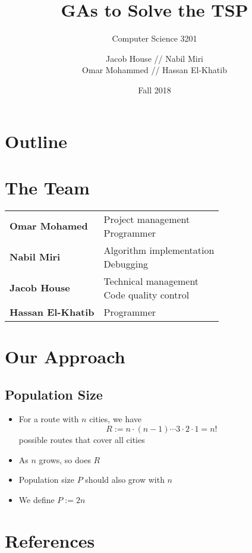 \documentclass[xcolor={usenames,dvipsnames,svgnames}]{beamer}
\title{GAs to Solve the TSP}
\subtitle{Computer Science 3201}
\author{Jacob House // Nabil Miri \\ Omar Mohammed // Hassan El-Khatib}
\date{Fall 2018}
\begin{document}
\begin{frame}[plain]
\titlepage
\end{frame}

\startheads

\section*{Outline}
\begin{frame}
	\tableofcontents
\end{frame}

\section{The Team}
\begin{frame}
\def\arraystretch{2}%
\begin{tabular}{>{\color{structure}\bfseries}ll}
	Omar Mohamed & \parbox[t]{.75\linewidth}{Project management \\ Programmer} \\
	Nabil Miri & \parbox[t]{.75\linewidth}{Algorithm implementation \\ Debugging} \\
	Jacob House & \parbox[t]{.75\linewidth}{Technical management \\ Code quality control} \\
	Hassan El-Khatib & Programmer
\end{tabular}
\end{frame}

\section{Our Approach}
\subsection{Population Size}
\begin{frame}
\begin{itemize}[<+->]
	\item For a route with $n$ cities, we have
	\begin{equation*}
	R := n \cdot (n-1) \cdots 3 \cdot 2 \cdot 1 = n!
	\end{equation*}
	possible routes that cover all cities
	\item As $n$ grows, so does $R$
	\item Population size $P$ should also grow with $n$
	\item We define $P := 2n$
\end{itemize}
\end{frame}


\section{References}
\begin{frame}[allowframebreaks]
\nocite{*}
\printbibliography
\end{frame}
\end{document}
